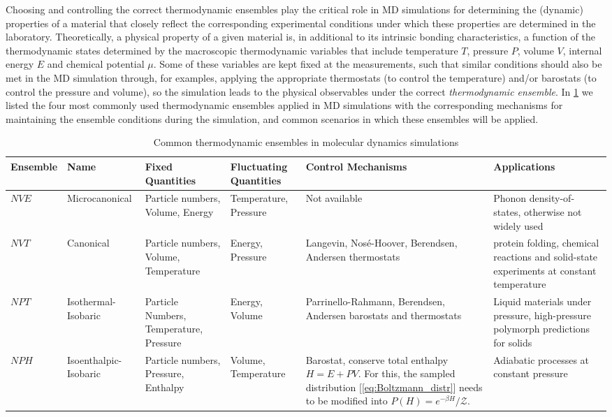 Choosing and controlling the correct thermodynamic ensembles play the critical role in MD simulations for determining the (dynamic) properties of a material that closely reflect the corresponding experimental conditions under which these properties are determined in the laboratory. Theoretically, a physical property of a given material is, in additional to its intrinsic bonding characteristics, a function of the thermodynamic states determined by the macroscopic thermodynamic variables that include temperature $T$, pressure $P$, volume $V$, internal energy $E$ and chemical potential $\mu$. Some of these variables are kept fixed at the measurements, such that similar conditions should also be met in the MD simulation through, for examples, applying the appropriate thermostats (to control the temperature) and/or barostats (to control the pressure and volume), so the simulation leads to the physical observables under the correct \emph{thermodynamic ensemble}. In \cref{tab:thermodynamic_ensembles} we listed the four most commonly used thermodynamic ensembles applied in MD simulations with the corresponding mechanisms for maintaining the ensemble conditions during the simulation, and common scenarios in which these ensembles will be applied.
\begin{table}[tbh]
\footnotesize
    \centering
\caption{Common thermodynamic ensembles in molecular dynamics simulations}
\label{tab:thermodynamic_ensembles}
    \begin{tabular}{lp{2.2cm}p{2.8cm}p{2cm}p{3cm}p{4cm}}
    \hline\hline
       \textbf{Ensemble}  & \textbf{Name} & \textbf{Fixed Quantities} & \textbf{Fluctuating Quantities} & \textbf{Control Mechanisms} &  \textbf{Applications} \\\hline
        $NVE$ & Microcanonical & Particle numbers, Volume, Energy & Temperature, Pressure & Not available & Phonon density-of-states, otherwise not widely used  \\\hline
        $NVT$ & Canonical & Particle numbers, Volume, Temperature & Energy, Pressure  & Langevin, Nos\'{e}-Hoover, Berendsen, Andersen thermostats & protein folding, chemical reactions and solid-state experiments at constant temperature  \\ \hline
        
        $NPT$ & Isothermal-Isobaric & Particle Numbers, Temperature, Pressure & Energy, Volume  &  Parrinello-Rahmann, Berendsen, Andersen barostats and thermostats & Liquid materials under pressure, high-pressure polymorph predictions for solids  \\ \hline
        $NPH$ & Isoenthalpic-Isobaric & Particle numbers, Pressure, Enthalpy & Volume, Temperature & Barostat, conserve total enthalpy $H=E+PV$. For this, the sampled distribution [\cref{eq:Boltzmann_distr}] needs to be modified into $P(H)=e^{-\beta H}/\mathcal{Z}.$ & 	Adiabatic processes at constant pressure\\
        
         \hline\hline
        
    \end{tabular}
        
\end{table}

